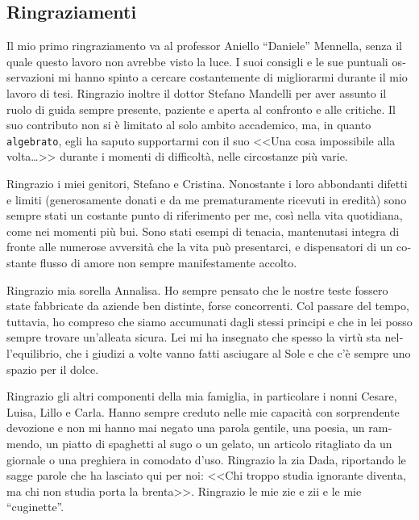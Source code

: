 \begin{otherlanguage}{italian}

\section*{\centering Ringraziamenti}

Il mio primo ringraziamento va al professor Aniello ``Daniele'' Mennella,
senza il quale questo lavoro non avrebbe visto la luce. I suoi consigli e
le sue puntuali osservazioni mi hanno spinto a cercare costantemente di
migliorarmi durante il mio lavoro di tesi. Ringrazio inoltre il dottor
Stefano Mandelli per aver assunto il ruolo di guida sempre presente,
paziente e aperta al confronto e alle critiche. Il suo contributo non si
\`e limitato al solo ambito accademico, ma, in quanto \texttt{algebrato},
egli ha saputo supportarmi con il suo <<Una cosa impossibile alla
volta\dots>> durante i momenti di difficolt\`a, nelle circostanze pi\`u
varie.

Ringrazio i miei genitori, Stefano e Cristina.  Nonostante i loro
abbondanti difetti e limiti (generosamente donati e da me prematuramente
ricevuti in eredit\`a) sono sempre stati un costante punto di riferimento
per me, cos\`i nella vita quotidiana, come nei momenti pi\`u bui.  Sono
stati esempi di tenacia, mantenutasi integra di fronte alle numerose
avversit\`a che la vita pu\`o presentarci, e dispensatori di un costante
flusso di amore non sempre manifestamente accolto.

Ringrazio mia sorella Annalisa. Ho sempre pensato che le nostre teste
fossero state fabbricate da aziende ben distinte, forse concorrenti.  Col
passare del tempo, tuttavia, ho compreso che siamo accumunati dagli stessi
principi e che in lei posso sempre trovare un'alleata sicura. Lei mi ha
insegnato che spesso la virt\`u sta nell'equilibrio, che i giudizi a volte
vanno fatti asciugare al Sole e che c'\`e sempre uno spazio per il dolce.

Ringrazio gli altri componenti della mia famiglia, in particolare i nonni
Cesare, Luisa, Lillo e Carla. Hanno sempre creduto nelle mie capacit\`a con
sorprendente devozione e non mi hanno mai negato una parola gentile, una
poesia, un rammendo, un piatto di spaghetti al sugo o un gelato, un
articolo ritagliato da un giornale o una preghiera in comodato d'uso.
Ringrazio la zia Dada, riportando le sagge parole che ha lasciato qui per
noi: <<Chi troppo studia ignorante diventa, ma chi non studia porta la
brenta>>. Ringrazio le mie zie e zii e le mie ``cuginette''.


\end{otherlanguage}
